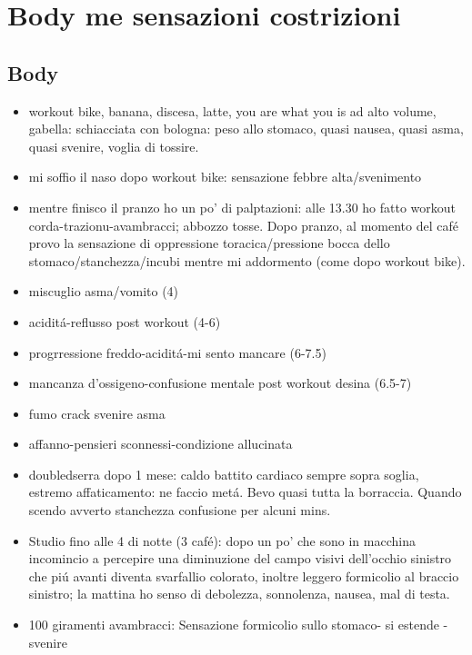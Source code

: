 \section{Body me sensazioni costrizioni}

\subsection{Body}

\begin{itemize}
\item workout bike, banana, discesa, latte, you are what you is ad alto volume, gabella: schiacciata con bologna: peso allo stomaco, quasi nausea, quasi asma, quasi svenire, voglia di tossire.
\item mi soffio il naso dopo workout bike: sensazione febbre alta/svenimento
\item mentre finisco il pranzo ho un po' di palptazioni: alle 13.30 ho fatto workout corda-trazionu-avambracci; abbozzo tosse.
Dopo pranzo, al momento del caf\'e provo la sensazione di oppressione toracica/pressione bocca dello stomaco/stanchezza/incubi mentre mi addormento (come dopo workout bike).
\item miscuglio asma/vomito (4)
\item acidit\'a-reflusso post workout (4-6)
\item progrressione freddo-acidit\'a-mi sento mancare (6-7.5)
\item mancanza d'ossigeno-confusione mentale post workout desina (6.5-7)
\item fumo crack svenire asma
\item affanno-pensieri sconnessi-condizione allucinata
\item doubledserra dopo 1 mese: caldo battito cardiaco sempre sopra soglia, estremo affaticamento: ne faccio met\'a. Bevo quasi tutta la borraccia.
Quando scendo avverto stanchezza confusione per alcuni mins.
\item Studio fino alle 4 di notte (3 caf\'e): dopo un po' che sono in macchina incomincio a percepire una diminuzione del campo visivi dell'occhio sinistro che pi\'u avanti diventa svarfallio colorato, inoltre leggero formicolio al braccio sinistro; la mattina ho senso di debolezza, sonnolenza, nausea, mal di testa.
\item 100 giramenti avambracci: Sensazione formicolio sullo stomaco- si estende - svenire

\end{itemize}
